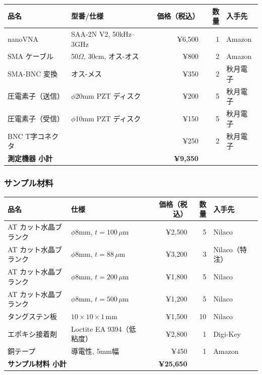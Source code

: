 \documentclass[11pt,a4paper]{article}
\begin{document}
\begin{center}
\small
\begin{tabular}{llrrl}
\toprule
品名 & 型番/仕様 & 価格（税込） & 数量 & 入手先 \\
\midrule
nanoVNA & SAA-2N V2, 50kHz--3GHz & ¥6,500 & 1 & Amazon \\
SMA ケーブル & 50$\Omega$, 30cm, オス-オス & ¥800 & 2 & Amazon \\
SMA-BNC 変換 & オス-メス & ¥350 & 2 & 秋月電子 \\
圧電素子（送信） & $\phi$20mm PZT ディスク & ¥200 & 5 & 秋月電子 \\
圧電素子（受信） & $\phi$10mm PZT ディスク & ¥150 & 5 & 秋月電子 \\
BNC T字コネクタ & & ¥250 & 2 & 秋月電子 \\
\midrule
\multicolumn{2}{l}{\textbf{測定機器 小計}} & \textbf{¥9,350} & & \\
\bottomrule
\end{tabular}
\end{center}

\subsubsection{サンプル材料}

\begin{center}
\small
\begin{tabular}{llrrl}
\toprule
品名 & 仕様 & 価格（税込） & 数量 & 入手先 \\
\midrule
AT カット水晶ブランク & $\phi$8mm, $t=100\,\mu$m & ¥2,500 & 5 & Nilaco \\
AT カット水晶ブランク & $\phi$8mm, $t=88\,\mu$m & ¥3,200 & 3 & Nilaco（特注）\\
AT カット水晶ブランク & $\phi$8mm, $t=200\,\mu$m & ¥1,800 & 5 & Nilaco \\
AT カット水晶ブランク & $\phi$8mm, $t=500\,\mu$m & ¥1,200 & 5 & Nilaco \\
タングステン板 & $10\times10\times1$\,mm & ¥1,500 & 10 & Nilaco \\
エポキシ接着剤 & Loctite EA 9394（低粘度）& ¥2,800 & 1 & Digi-Key \\
銅テープ & 導電性, 5mm幅 & ¥450 & 1 & Amazon \\
\midrule
\multicolumn{2}{l}{\textbf{サンプル材料 小計}} & \textbf{¥25,650} & & \\
\bottomrule
\end{tabular}
\end{center}
\end{document}
